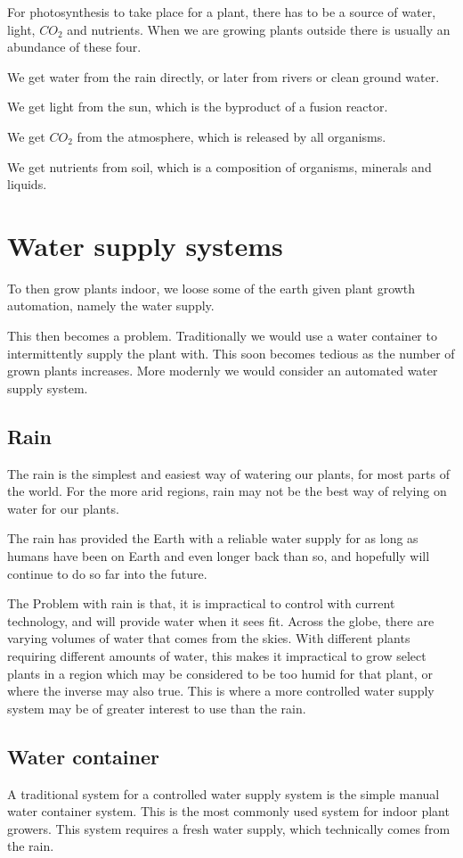 \documentclass[a4paper,12pt,twoside,openright,titlepage]{book}
\begin{document}
For photosynthesis to take place for a plant, there has to be a source of water, light, $CO_2$ and nutrients.
When we are growing plants outside there is usually an abundance of these four.

We get water from the rain directly, or later from rivers or clean ground water.

We get light from the sun, which is the byproduct of a fusion reactor.

We get $CO_2$ from the atmosphere, which is released by all organisms.

We get nutrients from soil, which is a composition of organisms, minerals and liquids.

\section{Water supply systems}
To then grow plants indoor, we loose some of the earth given plant growth automation, namely the water supply.

This then becomes a problem. Traditionally we would use a water container to intermittently supply the plant with. This soon becomes tedious as the number of grown plants increases.
More modernly we would consider an automated water supply system.

\subsection{Rain}
The rain is the simplest and easiest way of watering our plants, for most parts of the world. For the more arid regions, rain may not be the best way of relying on water for our plants.

The rain has provided the Earth with a reliable water supply for as long as humans have been on Earth and even longer back than so, and hopefully will continue to do so far into the future.

The Problem with rain is that, it is impractical to control with current technology, and will provide water when it sees fit.
Across the globe, there are varying volumes of water that comes from the skies. With different plants requiring different amounts of water, this makes it impractical to grow select plants in a region which may be considered to be too humid for that plant, or where the inverse may also true. This is where a more controlled water supply system may be of greater interest to use than the rain.

\subsection{Water container}
A traditional system for a controlled water supply system is the simple manual water container system.
This is the most commonly used system for indoor plant growers. This system requires a fresh water supply, which technically comes from the rain.
\end{document}
